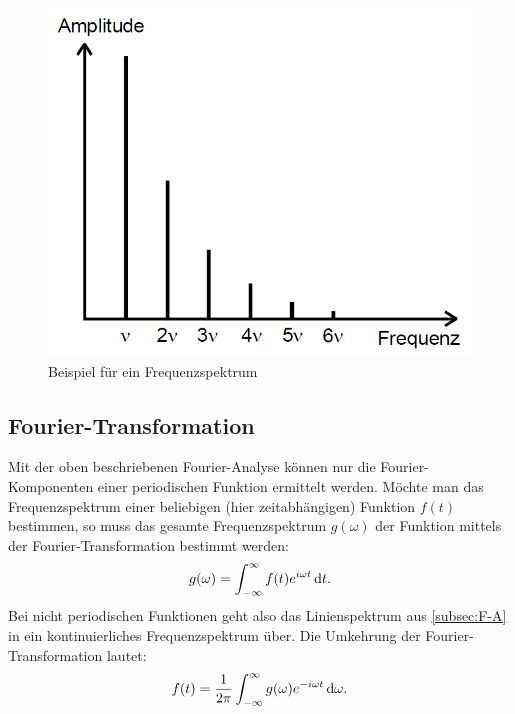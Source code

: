 \begin{figure}
	\centering
	\includegraphics[scale=0.3]{content/images/Spektrum.png}
	\caption{Beispiel für ein Frequenzspektrum\cite{V351}}
	\label{fig:Spektrum}
\end{figure}

\subsection{Fourier-Transformation}\label{F-T}
Mit der oben beschriebenen Fourier-Analyse können nur die Fourier-Komponenten einer periodischen Funktion ermittelt werden. Möchte man das Frequenzspektrum einer beliebigen (hier zeitabhängigen) Funktion $f(t)$ bestimmen, so muss das gesamte Frequenzspektrum $g(\omega)$ der Funktion mittels der Fourier-Transformation bestimmt werden:
\begin{equation}
g(\omega)=\int_{-\infty}^\infty f(t)e^{i\omega t}\mathop{}\!\mathrm{d} t\text{.}
\end{equation}  
Bei nicht periodischen Funktionen geht also das Linienspektrum aus \ref{subsec:F-A} in ein kontinuierliches Frequenzspektrum über.\newline
Die Umkehrung der Fourier-Transformation lautet:
\begin{equation}
f(t)=\frac{1}{2\pi}\int_{-\infty}^\infty g(\omega)e^{-i\omega t}\mathop{}\!\mathrm{d}\omega\text{.}
\end{equation}  
